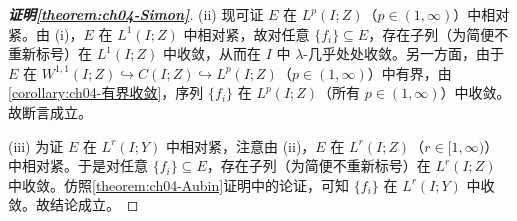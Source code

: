 \documentclass[../../main.tex]{subfiles}%
\begin{document}
\begin{proof}[\textbf{证明\cref{theorem:ch04-Simon}}]
(ii) 现可证 $E$ 在 $L^p(I;Z)$（$p\in(1,\infty)$）中相对紧。由 (i)，$E$ 在 $L^1(I;Z)$ 中相对紧，故对任意 $\{f_i\}\subseteq E$，存在子列（为简便不重新标号）在 $L^1(I;Z)$ 中收敛，从而在 $I$ 中 $\lambda$-几乎处处收敛。另一方面，由于 $E$ 在 $W^{1,1}(I;Z)\hookrightarrow C(I;Z)\hookrightarrow L^p(I;Z)$（$p\in(1,\infty)$）中有界，由\cref{corollary:ch04-有界收敛}，序列 $\{f_i\}$ 在 $L^p(I;Z)$（所有 $p\in(1,\infty)$）中收敛。故断言成立。

(iii) 为证 $E$ 在 $L^r(I;Y)$ 中相对紧，注意由 (ii)，$E$ 在 $L^r(I;Z)$（$r\in[1,\infty)$）中相对紧。于是对任意 $\{f_i\}\subseteq E$，存在子列（为简便不重新标号）在 $L^r(I;Z)$ 中收敛。仿照\cref{theorem:ch04-Aubin}证明中的论证，可知 $\{f_i\}$ 在 $L^r(I;Y)$ 中收敛。故结论成立。
\end{proof}
\end{document}
